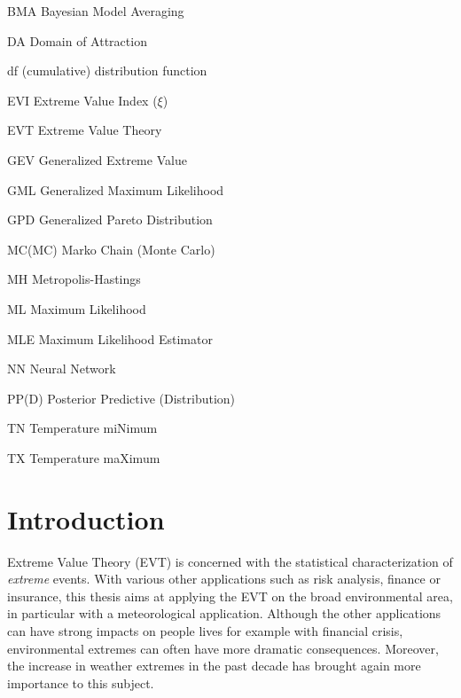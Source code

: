 \documentclass[11pt,a4paper,openany, twosided]{book}
\newcommand{\abbrlabel}[1]{\makebox[3cm][l]{\textbf{#1}\ \dotfill}}
\newenvironment{abbreviations}{\begin{list}{}{\renewcommand{\makelabel}{\abbrlabel}}}{\end{list}}
\newcommand\blankpage{%
    \null
    \thispagestyle{empty}%
    \addtocounter{page}{-1}%
    \newpage}
\begin{document}
\begin{center}
\begin{abbreviations}
	\item[BMA] Bayesian Model Averaging
	\item[DA] Domain of Attraction
	\item[df]\label{df}  (cumulative) distribution function
	\item[EVI] Extreme Value Index ($\xi$)
	\item[EVT] Extreme Value Theory
	\item[GEV] Generalized Extreme Value
	\item[GML] Generalized Maximum Likelihood
	\item[GPD] Generalized Pareto Distribution %
	\item[MC(MC)] Marko Chain (Monte Carlo)
	\item[MH] Metropolis-Hastings 
	\item[ML] Maximum Likelihood 
	\item[MLE] Maximum Likelihood Estimator
	\item[NN] Neural Network
	\item[PP(D)] Posterior Predictive (Distribution)
	\item[TN] Temperature miNimum
	\item[TX] Temperature maXimum
	
\end{abbreviations}
\end{center}


\renewcommand\labelitemi{\normalsize$\bullet$}



\afterpage{\blankpage}


\chapter*{Introduction}
\thispagestyle{empty}


Extreme Value Theory (EVT) is concerned with the statistical characterization of \emph{extreme} events. 
With various other applications such as risk analysis, finance or insurance, this thesis aims at applying the EVT on the broad environmental area, in particular with a meteorological application. Although the other applications can have strong impacts on people lives for example with financial crisis, environmental extremes can often have more dramatic consequences.
Moreover, the increase in weather extremes in the past decade has brought again more importance to this subject.
\end{document}
